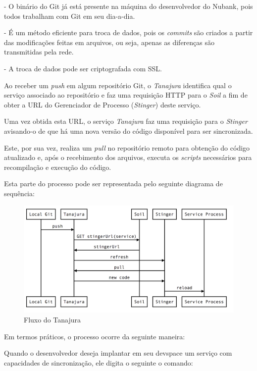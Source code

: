\documentclass[]{politex}
\begin{document}
	- O binário do Git já está presente na máquina do desenvolvedor do Nubank, pois todos trabalham com Git em seu dia-a-dia.
	
	- É um método eficiente para troca de dados, pois os \textit{commits} são criados a partir das modificações feitas em arquivos, ou seja, apenas as diferenças são transmitidas pela rede.
	
	- A troca de dados pode ser criptografada com SSL.

	Ao receber um \textit{push} em algum repositório Git, o \textit{Tanajura} identifica qual o serviço associado ao repositório e faz uma requisição HTTP para o \textit{Soil} a fim de obter a URL do Gerenciador de Processo (\textit{Stinger}) deste serviço.
	
	Uma vez obtida esta URL, o serviço \textit{Tanajura} faz uma requisição para o \textit{Stinger} avisando-o de que há uma nova versão do código disponível para ser sincronizada.
	
	Este, por sua vez, realiza um \textit{pull} no repositório remoto para obtenção do código atualizado e, após o recebimento dos arquivos, executa os \textit{scripts} necessários para recompilação e execução do código.
	
	Esta parte do processo pode ser representada pelo seguinte diagrama de sequência:
		\begin{figure}[htb]
			\caption{\label{fig_arquitetura2}Fluxo do Tanajura}
			\begin{center}
			\includegraphics[scale=0.20]{tanajura-flow.png}
			\end{center}
		\end{figure}

	Em termos práticos, o processo ocorre da seguinte maneira:
	
	Quando o desenvolvedor deseja implantar em seu devspace um serviço com capacidades de sincronização, ele digita o seguinte o comando:
\end{document}
